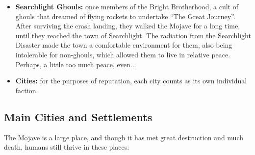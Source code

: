 \documentclass[11pt]{article} %
\begin{document}
\begin{itemize}
\item \textbf{Searchlight Ghouls:} once members of the Bright Brotherhood, a cult of ghouls that dreamed of flying rockets to undertake ``The Great Journey''. After surviving the crash landing, they walked the Mojave for a long time, until they reached the town of Searchlight. The radiation from the Searchlight Disaster made the town a comfortable environment for them, also being intolerable for non-ghouls, which allowed them to live in relative peace. Perhaps, a little too much peace, even...

\item \textbf{Cities:} for the purposes of reputation, each city counts as its own individual faction.
\end{itemize}

\subsection{Main Cities and Settlements}

The Mojave is a large place, and though it has met great destruction and much death, humans still thrive in these places:
\end{document}
